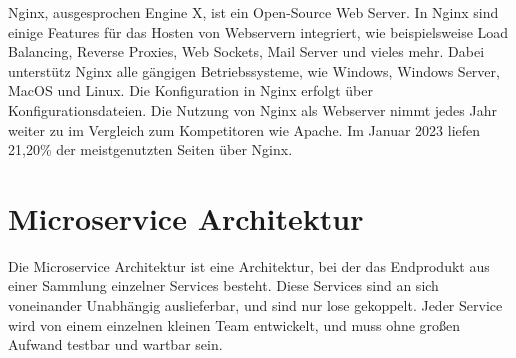 Nginx, ausgesprochen Engine X, ist ein Open-Source Web Server.
In Nginx sind einige Features für das Hosten von Webservern integriert, wie beispielsweise Load Balancing, Reverse Proxies, Web Sockets, Mail Server und vieles mehr.
Dabei unterstütz Nginx alle gängigen Betriebssysteme, wie Windows, Windows Server, MacOS und Linux.
Die Konfiguration in Nginx erfolgt über Konfigurationsdateien.
Die Nutzung von Nginx als Webserver nimmt jedes Jahr weiter zu im Vergleich zum Kompetitoren wie Apache.
Im Januar 2023 liefen 21,20\% der meistgenutzten Seiten über Nginx.
~\autocite{nginx:nginx}

\section{Microservice Architektur}
\label{sec:microservices}

Die Microservice Architektur ist eine Architektur, bei der das Endprodukt aus einer Sammlung einzelner Services besteht.
Diese Services sind an sich voneinander Unabhängig auslieferbar, und sind nur lose gekoppelt.
Jeder Service wird von einem einzelnen kleinen Team entwickelt, und muss ohne großen Aufwand testbar und wartbar sein.
~\autocite{richardson:microservices}

